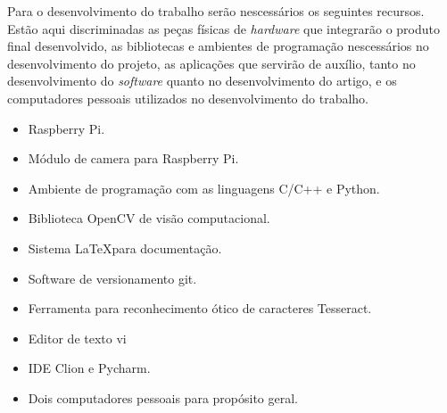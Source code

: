 Para o desenvolvimento do trabalho serão nescessários os seguintes recursos. 
Estão aqui discriminadas as peças físicas de \emph{hardware} que integrarão o produto final desenvolvido,
as bibliotecas e ambientes de programação nescessários no desenvolvimento do projeto, as aplicações
que servirão de auxílio, tanto no desenvolvimento do \emph{software} quanto no desenvolvimento do artigo,
e os computadores pessoais utilizados no desenvolvimento do trabalho.

\begin{itemize}
	\item Raspberry Pi.
	\item Módulo de camera para Raspberry Pi.
	\item Ambiente de programação com as linguagens C/C++ e Python.
	\item Biblioteca OpenCV de visão computacional.
	\item Sistema \LaTeX para documentação.
	\item Software de versionamento git.
	\item Ferramenta para reconhecimento ótico de caracteres Tesseract.
	\item Editor de texto vi
	\item IDE Clion e Pycharm.
	\item Dois computadores pessoais para propósito geral.
\end{itemize}
